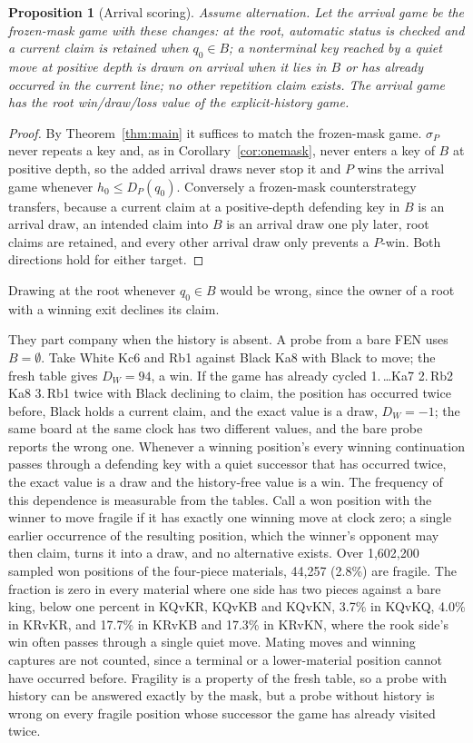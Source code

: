 \documentclass[journal]{IEEEtran}
\newtheorem{proposition}{Proposition}
\theoremstyle{definition}
\theoremstyle{remark}
\begin{document}
\begin{proposition}[Arrival scoring]\label{prop:arrival}
Assume alternation. Let the arrival game be the frozen-mask game with these changes: at the root, automatic status is checked and a current claim is retained when $q_0\in B$; a nonterminal key reached by a quiet move at positive depth is drawn on arrival when it lies in $B$ or has already occurred in the current line; no other repetition claim exists. The arrival game has the root win/draw/loss value of the explicit-history game.
\end{proposition}
\begin{proof}
By Theorem~\ref{thm:main} it suffices to match the frozen-mask game. $\sigma_P$ never repeats a key and, as in Corollary~\ref{cor:onemask}, never enters a key of $B$ at positive depth, so the added arrival draws never stop it and $P$ wins the arrival game whenever $h_0\le D_P(q_0)$. Conversely a frozen-mask counterstrategy transfers, because a current claim at a positive-depth defending key in $B$ is an arrival draw, an intended claim into $B$ is an arrival draw one ply later, root claims are retained, and every other arrival draw only prevents a $P$-win. Both directions hold for either target.
\end{proof}

Drawing at the root whenever $q_0\in B$ would be wrong, since the owner of a root with a winning exit declines its claim.

They part company when the history is absent. A probe from a bare FEN uses $B=\emptyset$. Take White Kc6 and Rb1 against Black Ka8 with Black to move; the fresh table gives $D_W=94$, a win. If the game has already cycled 1.\,\ldots Ka7 2.\,Rb2 Ka8 3.\,Rb1 twice with Black declining to claim, the position has occurred twice before, Black holds a current claim, and the exact value is a draw, $D_W=-1$; the same board at the same clock has two different values, and the bare probe reports the wrong one. Whenever a winning position's every winning continuation passes through a defending key with a quiet successor that has occurred twice, the exact value is a draw and the history-free value is a win. The frequency of this dependence is measurable from the tables. Call a won position with the winner to move fragile if it has exactly one winning move at clock zero; a single earlier occurrence of the resulting position, which the winner's opponent may then claim, turns it into a draw, and no alternative exists. Over 1{,}602{,}200 sampled won positions of the four-piece materials, 44{,}257 (2.8\%) are fragile. The fraction is zero in every material where one side has two pieces against a bare king, below one percent in KQvKR, KQvKB and KQvKN, 3.7\% in KQvKQ, 4.0\% in KRvKR, and 17.7\% in KRvKB and 17.3\% in KRvKN, where the rook side's win often passes through a single quiet move. Mating moves and winning captures are not counted, since a terminal or a lower-material position cannot have occurred before. Fragility is a property of the fresh table, so a probe with history can be answered exactly by the mask, but a probe without history is wrong on every fragile position whose successor the game has already visited twice.
\end{document}
